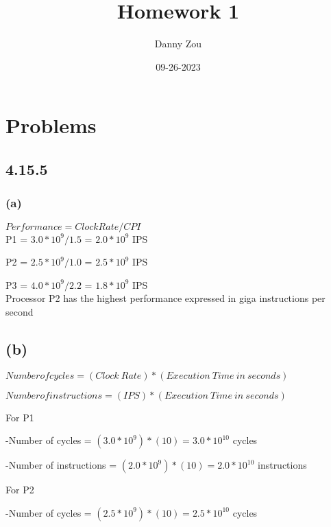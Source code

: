 \documentclass{article}
\title{Homework 1}
\date{09-26-2023}
\author{Danny Zou}
\begin{document}
    \maketitle
    \onehalfspacing

    \section*{Problems}

    \subsection*{4.15.5}
    
    \subsubsection*{(a)}
    
    $Performance = {Clock Rate}/CPI$\\

    P1 = ${3.0 * 10^9}/1.5$ = $2.0 * 10^9$ IPS

    P2 = ${2.5 * 10^9}/1.0$ =  ${2.5 * 10^9}$ IPS

    P3 = ${4.0 * 10^9}/2.2$ = ${1.8 * 10^9}$  IPS\\

    Processor P2 has the highest performance expressed in giga instructions per second
    
    \subsection*{(b)}
    
    $Number of cycles = (Clock\ Rate) * (Execution\ Time\ in\ seconds)$

    $Number of instructions = (IPS) * (Execution\ Time\ in\ seconds)$

    \vspace{12pt}

    For P1
    
    -Number of cycles = $(3.0 * 10^9) * (10) = 3.0 * 10^{10}$ cycles

    -Number of instructions = $(2.0 * 10^9) * (10) = 2.0 * 10^{10}$ instructions

    \vspace*{6pt}

    For P2

    -Number of cycles = $(2.5 * 10^9) * (10) = 2.5 * 10^{10}$ cycles
\end{document}
